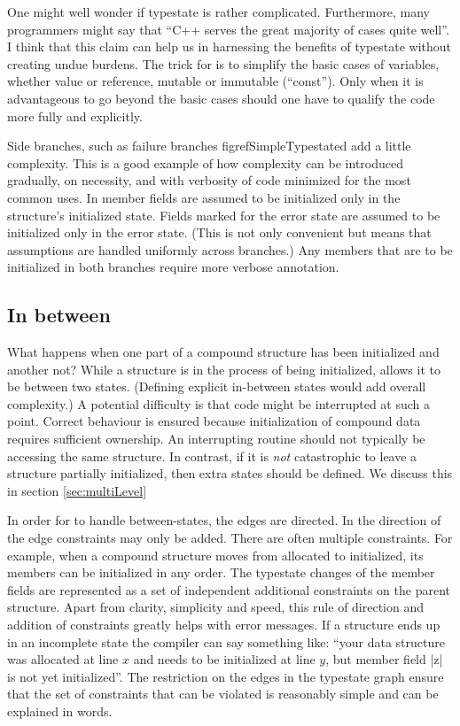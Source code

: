 \documentclass[10pt]{amsart}
\begin{document}
One might well wonder if typestate is rather complicated.
Furthermore, many programmers might say that ``C++ serves the great
majority of cases quite well''.  I think that this claim can help us
in harnessing the benefits of typestate without creating undue
burdens.  The trick for \Utop is to simplify the basic cases of
variables, whether value or reference, mutable or immutable
(``const'').  Only when it is advantageous to go beyond the basic
cases should one have to qualify the code more fully and explicitly.

Side branches, such as failure branches figref{SimpleTypestate}{d}
add a little complexity.  This is a good example of how complexity can
be introduced gradually, on necessity, and with verbosity of code
minimized for the most common uses.  In \Utop member fields are
assumed to be initialized only in the structure's initialized state.
Fields marked for the error state are assumed to be initialized only
in the error state.  (This is not only convenient but means that
assumptions are handled uniformly across branches.)  Any members that
are to be initialized in both branches require more verbose
annotation.

\subsection{In between}

What happens when one part of a compound structure has been
initialized and another not?  While a structure is in the process of
being initialized, \Utop allows it to be between two states.
(Defining explicit in-between states would add overall complexity.)  A
potential difficulty is that code might be interrupted at such a
point.  Correct behaviour is ensured because initialization of
compound data requires sufficient ownership.  An interrupting routine
should not typically be accessing the same structure.  In contrast, if
it is \emph{not} catastrophic to leave a structure partially
initialized, then extra states should be defined.  We discuss this in
section \ref{sec:multiLevel}

In order for \Utop to handle between-states, the edges are directed.
In the direction of the edge constraints may only be added.  There are
often multiple constraints.  For example, when a compound structure
moves from allocated to initialized, its members can be initialized in
any order.  The typestate changes of the member fields are represented
as a set of independent additional constraints on the parent
structure.  Apart from clarity, simplicity and speed, this rule of
direction and addition of constraints greatly helps with error
messages.  If a structure ends up in an incomplete state the compiler
can say something like: ``your data structure was allocated at line
$x$ and needs to be initialized at line $y$, but member field |z| is
not yet initialized''.  The restriction on the edges in the typestate
graph ensure that the set of constraints that can be violated is
reasonably simple and can be explained in words.
\end{document}
